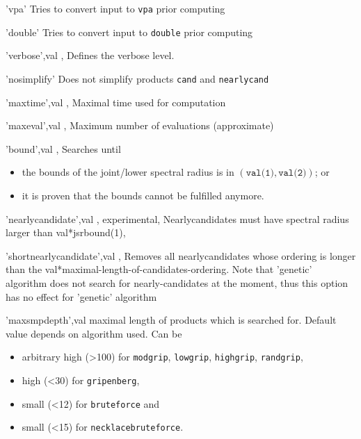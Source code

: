 \begin{param}
\item['vpa']                           Tries to convert input to \texttt{vpa} prior computing
   \item['double']                        Tries to convert input to \texttt{double} prior computing
   \item['verbose',val]                   , Defines the verbose level. 
   \item['nosimplify']                    Does not simplify products \texttt{cand} and \texttt{nearlycand}
   \item['maxtime',val]                   , Maximal time used for computation
   \item['maxeval',val]                   , Maximum number of evaluations (approximate)
   \item['bound',val]                     , Searches until 
    \begin{itemize}
    \item  the bounds of the joint/lower spectral radius is in $(\texttt{val(1)}, \texttt{val(2)})$; or
    \item  it is proven that the bounds cannot be fulfilled anymore.
    \end{itemize}

   \item['nearlycandidate',val]           , experimental, Nearlycandidates must have spectral radius larger than val*jsrbound(1),
   \item['shortnearlycandidate',val]      , Removes all nearlycandidates whose ordering is longer than the val*maximal-length-of-candidates-ordering.
                                          Note that 'genetic' algorithm does not search for nearly-candidates at the moment, thus this option has no effect for 'genetic' algorithm
   \item['maxsmpdepth',val]               maximal length of products which is searched for. Default value depends on algorithm used. Can be
    \begin{itemize}
    \item arbitrary high (>100) for \texttt{modgrip}, \texttt{lowgrip}, \texttt{highgrip}, \texttt{randgrip}, 
    \item high (<30) for \texttt{gripenberg},
    \item small (<12) for \texttt{bruteforce} and   
    \item small (<15) for \texttt{necklacebruteforce}.  
    \end{itemize}


\end{param}
